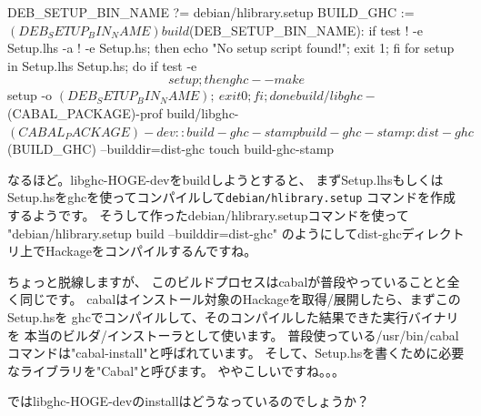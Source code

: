 \documentclass[mingoth,a4paper]{jsarticle}
\begin{document}
\begin{commandline}
DEB_SETUP_BIN_NAME ?= debian/hlibrary.setup
BUILD_GHC := $(DEB_SETUP_BIN_NAME) build

$(DEB_SETUP_BIN_NAME):
        if test ! -e Setup.lhs -a ! -e Setup.hs; then echo "No setup script found!"; exit 1; fi
        for setup in Setup.lhs Setup.hs; do if test -e $$setup; then ghc --make $$setup -o $(DEB_SETUP_BIN_NAME); \
          exit 0; fi; done

build/libghc-$(CABAL_PACKAGE)-prof build/libghc-$(CABAL_PACKAGE)-dev:: build-ghc-stamp

build-ghc-stamp: dist-ghc
        $(BUILD_GHC) --builddir=dist-ghc
        touch build-ghc-stamp
\end{commandline}

なるほど。libghc-HOGE-devをbuildしようとすると、
まずSetup.lhsもしくはSetup.hsをghcを使ってコンパイルして\texttt{debian/hlibrary.setup}
コマンドを作成するようです。
そうして作ったdebian/hlibrary.setupコマンドを使って
"debian/hlibrary.setup build --builddir=dist-ghc"
のようにしてdist-ghcディレクトリ上でHackageをコンパイルするんですね。

ちょっと脱線しますが、
このビルドプロセスはcabalが普段やっていることと全く同じです。
cabalはインストール対象のHackageを取得/展開したら、まずこのSetup.hsを
ghcでコンパイルして、そのコンパイルした結果できた実行バイナリを
本当のビルダ/インストーラとして使います。
普段使っている/usr/bin/cabalコマンドは"cabal-install"と呼ばれています。
そして、Setup.hsを書くために必要なライブラリを"Cabal"と呼びます。
ややこしいですね。。。

ではlibghc-HOGE-devのinstallはどうなっているのでしょうか？

\end{document}
